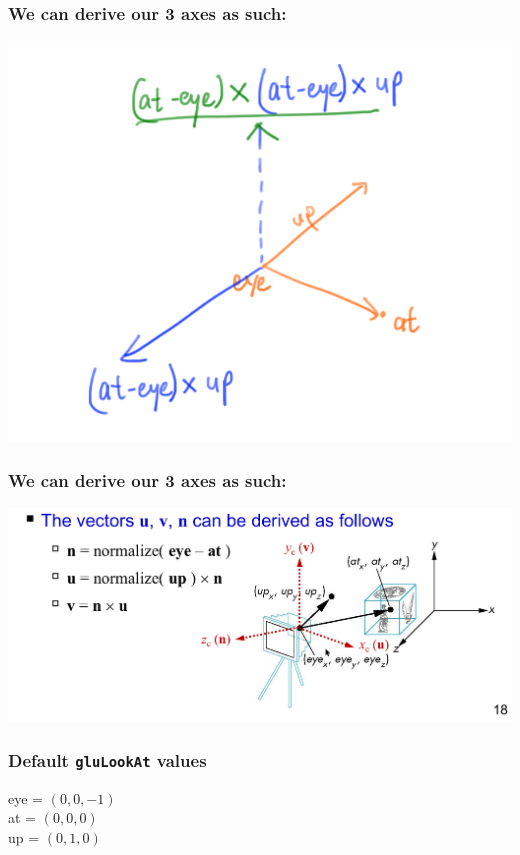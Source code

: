 \documentclass{beamer}
\begin{document}
\begin{frame}
    \frametitle{We can derive our 3 axes as such:}

    \begin{center}
        \includegraphics[scale=1.3]{q3.png}
    \end{center}

\end{frame}

\begin{frame}
    \frametitle{We can derive our 3 axes as such:}

    \begin{center}
        \includegraphics[scale=0.3]{glulookat.png}
    \end{center}

\end{frame}

\begin{frame}
    \frametitle{Default \texttt{gluLookAt} values}
    
    eye = $(0, 0, -1)$\\
    at = $(0, 0, 0)$\\
    up = $(0, 1, 0)$\\

\end{frame}
\end{document}
